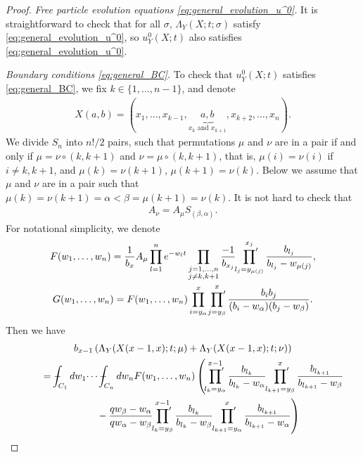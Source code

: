 \documentclass[11pt]{article}
\numberwithin{equation}{section}
\def\Xint#1{\mathchoice
{\XXint\displaystyle\textstyle{#1}}%
{\XXint\textstyle\scriptstyle{#1}}%
{\XXint\scriptstyle\scriptscriptstyle{#1}}%
{\XXint\scriptscriptstyle\scriptscriptstyle{#1}}%
\!\int}
\def\XXint#1#2#3{{\setbox0=\hbox{$#1{#2#3}{\int}$}
\vcenter{\hbox{$#2#3$}}\kern-.5\wd0}}
\def\dashint{\Xint-}
\newcommand{\prodprime}{\sideset{}{'}\prod}
\begin{document}
\begin{proof}
\textit{Free particle evolution equations \eqref{eq:general_evolution_u^0}.}
 It is straightforward to check that for all $\sigma$, $\Lambda_Y(X; t; \sigma)$ satisfy \eqref{eq:general_evolution_u^0}, so $u^0_Y(X; t)$ also satisf\/ies \eqref{eq:general_evolution_u^0}.

\textit{Boundary conditions \eqref{eq:general_BC}.}
 To check that $u^0_Y(X; t)$ satisf\/ies \eqref{eq:general_BC}, we f\/ix $k \in \{ 1, \dotsc, n - 1 \}$, and denote
 \begin{gather*}
 X(a, b) = (x_1, \dotsc, x_{k - 1}, \!\!\underbrace{a, b}_{x_k \text{ and } x_{k + 1}}\!\! , x_{k + 2}, \dotsc, x_n).
 \end{gather*}
 We divide $S_n$ into $n!/2$ pairs, such that permutations $\mu$ and $\nu$ are in a pair if and only if $\mu = \nu \circ (k, k + 1)$ and $\nu = \mu \circ (k, k + 1)$, that is, $\mu(i) = \nu(i)$ if $i \neq k, k + 1$, and $\mu(k) = \nu(k + 1)$, $\mu(k + 1) = \nu(k)$. Below we assume that $\mu$ and $\nu$ are in a pair such that $\mu(k) = \nu(k + 1) = \alpha < \beta = \mu(k + 1) = \nu(k)$. It is not hard to check that
 \begin{gather*}
 A_{\nu} = A_{\mu} S_{(\beta, \alpha)}.
 \end{gather*}
 For notational simplicity, we denote
 \begin{gather*}
 F(w_1, \dotsc, w_n) =  \frac{1}{b_x} A_{\mu} \prod^n_{l = 1} e^{-w_l t} \prod_{\substack{j = 1, \dotsc, n \\ j \neq k, k + 1}} \frac{-1}{b_{x_j}} \prodprime^{x_j}_{l_j = y_{\mu(j)}} \frac{b_{l_j}}{b_{l_j} - w_{\mu(j)}}, \\
 G(w_1, \dotsc, w_n) =  F(w_1, \dotsc, w_n) \prod^x_{i = y_{\alpha}} \prodprime^x_{j = y_{\beta}} \frac{b_i b_j}{(b_i - w_{\alpha})(b_j - w_{\beta})}.
 \end{gather*}
 Then we have
 \begin{gather}
   b_{x - 1} \left( \Lambda_Y(X(x - 1, x); t; \mu) + \Lambda_Y(X(x - 1, x); t; \nu) \right)\nonumber \\
   \qquad{}
 =   \dashint_{C_1} dw_1 \dotsi \dashint_{C_n} dw_n F(w_1, \dotsc, w_n) \left( \prodprime^{x - 1}_{l_k = y_{\alpha}} \frac{b_{l_k}}{b_{l_k} - w_{\alpha}} \prodprime^x_{l_{k + 1} = y_{\beta}} \frac{b_{l_{k + 1}}}{b_{l_{k + 1}} - w_{\beta}} \right. \nonumber\\
\left. \qquad\quad{} - \frac{qw_{\beta} - w_{\alpha}}{qw_{\alpha} - w_{\beta}} \prodprime^{x - 1}_{l_k = y_{\beta}} \frac{b_{l_k}}{b_{l_k} - w_{\beta}} \prodprime^x_{l_{k + 1} = y_{\alpha}} \frac{b_{l_{k + 1}}}{b_{l_{k + 1}} - w_{\alpha}} \right) \nonumber\\

\end{gather}
\end{proof}
\end{document}
